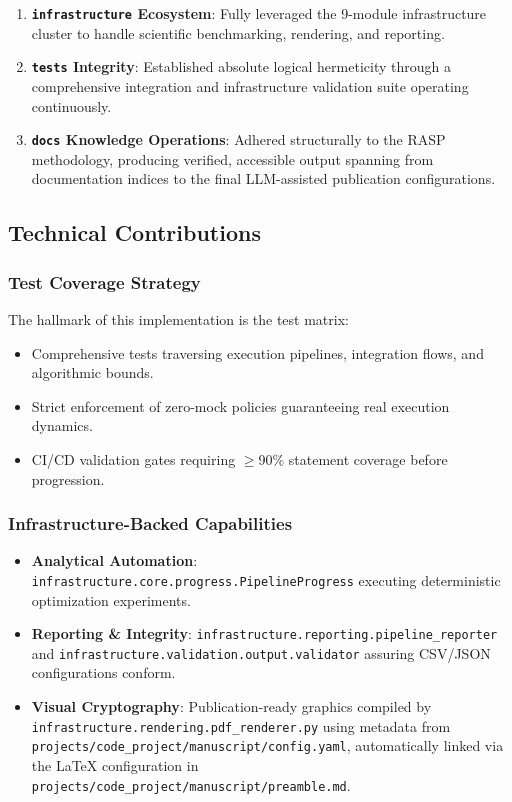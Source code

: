 \documentclass[
]{article}
\providecommand{\tightlist}{%
  \setlength{\itemsep}{0pt}\setlength{\parskip}{0pt}}
\begin{document}
\begin{enumerate}
\def\labelenumi{\arabic{enumi}.}
\tightlist
\item
  \textbf{\texttt{infrastructure} Ecosystem}: Fully leveraged the
  9-module infrastructure cluster to handle scientific benchmarking,
  rendering, and reporting.
\item
  \textbf{\texttt{tests} Integrity}: Established absolute logical
  hermeticity through a comprehensive integration and infrastructure
  validation suite operating continuously.
\item
  \textbf{\texttt{docs} Knowledge Operations}: Adhered structurally to
  the RASP methodology, producing verified, accessible output spanning
  from documentation indices to the final LLM-assisted publication
  configurations.
\end{enumerate}

\subsection{Technical Contributions}\label{technical-contributions}

\subsubsection{Test Coverage Strategy}\label{test-coverage-strategy}

The hallmark of this implementation is the test matrix:

\begin{itemize}
\tightlist
\item
  Comprehensive tests traversing execution pipelines, integration flows,
  and algorithmic bounds.
\item
  Strict enforcement of zero-mock policies guaranteeing real execution
  dynamics.
\item
  CI/CD validation gates requiring \texorpdfstring{\ensuremath{\geq}}{>=}90\% statement coverage before
  progression.
\end{itemize}

\subsubsection{Infrastructure-Backed
Capabilities}\label{infrastructure-backed-capabilities}

\begin{itemize}
\tightlist
\item
  \textbf{Analytical Automation}:
  \texttt{infrastructure.core.progress.PipelineProgress} executing
  deterministic optimization experiments.
\item
  \textbf{Reporting \& Integrity}:
  \texttt{infrastructure.reporting.pipeline\_reporter} and
  \texttt{infrastructure.validation.output.validator} assuring CSV/JSON
  configurations conform.
\item
  \textbf{Visual Cryptography}: Publication-ready graphics compiled by
  \texttt{infrastructure.rendering.pdf\_renderer.py} using metadata from
  \texttt{projects/code\_project/manuscript/config.yaml}, automatically
  linked via the LaTeX configuration in
  \texttt{projects/code\_project/manuscript/preamble.md}.
\end{itemize}
\end{document}
